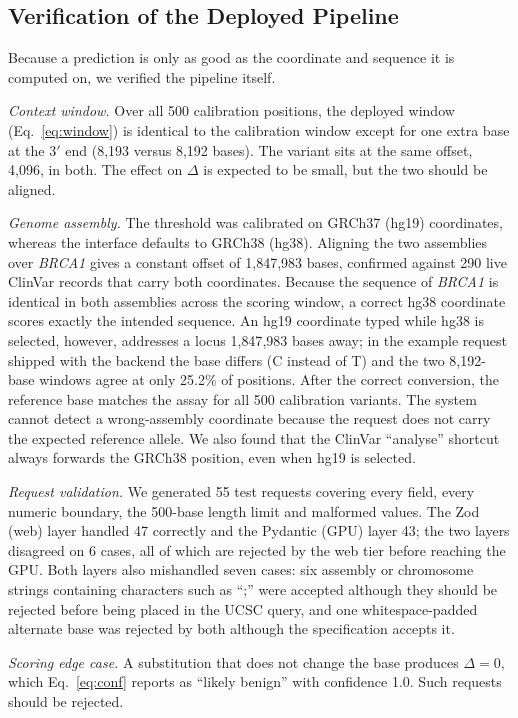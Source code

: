 \documentclass[conference,a4paper]{IEEEtran}
\begin{document}
\subsection{Verification of the Deployed Pipeline}
Because a prediction is only as good as the coordinate and sequence it is computed on, we verified the pipeline itself.

\textit{Context window.} Over all 500 calibration positions, the deployed window (Eq.~\eqref{eq:window}) is identical to the calibration window except for one extra base at the 3$'$ end (8{,}193 versus 8{,}192 bases). The variant sits at the same offset, 4{,}096, in both. The effect on $\Delta$ is expected to be small, but the two should be aligned.

\textit{Genome assembly.} The threshold was calibrated on GRCh37 (hg19) coordinates, whereas the interface defaults to GRCh38 (hg38). Aligning the two assemblies over \emph{BRCA1} gives a constant offset of 1{,}847{,}983 bases, confirmed against 290 live ClinVar records that carry both coordinates. Because the sequence of \emph{BRCA1} is identical in both assemblies across the scoring window, a correct hg38 coordinate scores exactly the intended sequence. An hg19 coordinate typed while hg38 is selected, however, addresses a locus 1{,}847{,}983 bases away; in the example request shipped with the backend the base differs (C instead of T) and the two 8{,}192-base windows agree at only 25.2\% of positions. After the correct conversion, the reference base matches the assay for all 500 calibration variants. The system cannot detect a wrong-assembly coordinate because the request does not carry the expected reference allele. We also found that the ClinVar ``analyse'' shortcut always forwards the GRCh38 position, even when hg19 is selected.

\textit{Request validation.} We generated 55 test requests covering every field, every numeric boundary, the 500-base length limit and malformed values. The Zod (web) layer handled 47 correctly and the Pydantic (GPU) layer 43; the two layers disagreed on 6 cases, all of which are rejected by the web tier before reaching the GPU. Both layers also mishandled seven cases: six assembly or chromosome strings containing characters such as ``;'' were accepted although they should be rejected before being placed in the UCSC query, and one whitespace-padded alternate base was rejected by both although the specification accepts it.

\textit{Scoring edge case.} A substitution that does not change the base produces $\Delta=0$, which Eq.~\eqref{eq:conf} reports as ``likely benign'' with confidence 1.0. Such requests should be rejected.
\end{document}
